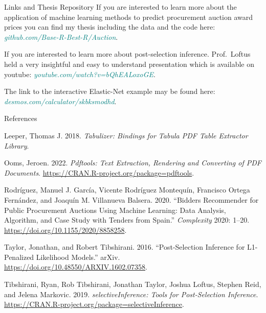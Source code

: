 \documentclass[
  11pt,
  ignorenonframetext,
]{beamer}
\newlength{\cslhangindent}
\newlength{\cslentryspacingunit} %
\newenvironment{CSLReferences}[2] %
 {%
  \setlength{\parindent}{0pt}
  \ifodd #1
  \let\oldpar\par
  \def\par{\hangindent=\cslhangindent\oldpar}
  \fi
  \setlength{\parskip}{#2\cslentryspacingunit}
 }%
 {}
\begin{document}
\begin{frame}{Links and Thesis Repository}
\protect\hypertarget{links-and-thesis-repository}{}
If you are interested to learn more about the application of machine
learning methods to predict procurement auction award prices you can
find my thesis including the data and the code here:
\textcolor{teal}{\textit{github.com/Base-R-Best-R/Auction}}.

If you are interested to learn more about post-selection inference.
Prof.~Loftus held a very insightful and easy to understand presentation
which is available on youtube:
\textcolor{teal}{\textit{youtube.com/watch?v=bQhEALoxoGE}}.

The link to the interactive Elastic-Net example may be found here:
\textcolor{teal}{\textit{desmos.com/calculator/skbksmodhd}}.
\end{frame}

\begin{frame}[allowframebreaks]{References}
\protect\hypertarget{references}{}
\hypertarget{refs}{}
\begin{CSLReferences}{1}{0}
\leavevmode{}%
Leeper, Thomas J. 2018. \emph{Tabulizer: Bindings for Tabula PDF Table
Extractor Library}.

\leavevmode{}%
Ooms, Jeroen. 2022. \emph{Pdftools: Text Extraction, Rendering and
Converting of PDF Documents}.
\url{https://CRAN.R-project.org/package=pdftools}.

\leavevmode{}%
Rodríguez, Manuel J. García, Vicente Rodríguez Montequín, Francisco
Ortega Fernández, and Joaquín M. Villanueva Balsera. 2020. {``Bidders
Recommender for Public Procurement Auctions Using Machine Learning: Data
Analysis, Algorithm, and Case Study with Tenders from Spain.''}
\emph{Complexity} 2020: 1--20.
\url{https://doi.org/10.1155/2020/8858258}.

\leavevmode{}%
Taylor, Jonathan, and Robert Tibshirani. 2016. {``Post-Selection
Inference for L1-Penalized Likelihood Models.''} arXiv.
\url{https://doi.org/10.48550/ARXIV.1602.07358}.

\leavevmode{}%
Tibshirani, Ryan, Rob Tibshirani, Jonathan Taylor, Joshua Loftus,
Stephen Reid, and Jelena Markovic. 2019. \emph{selectiveInference: Tools
for Post-Selection Inference}.
\url{https://CRAN.R-project.org/package=selectiveInference}.

\end{CSLReferences}
\end{frame}
\end{document}

